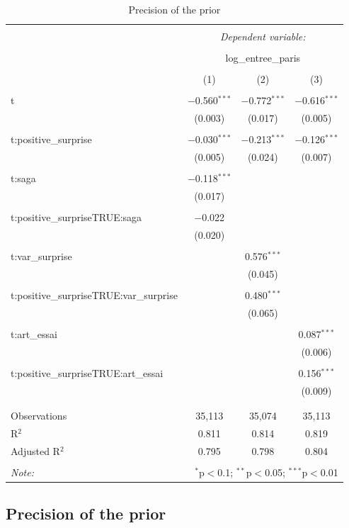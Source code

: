 \begin{table}[!htbp] \centering 
	\caption{Precision of the prior} 
	\label{} 
	\begin{tabular}{@{\extracolsep{5pt}}lccc} 
		\\[-1.8ex]\hline 
		\hline \\[-1.8ex] 
		& \multicolumn{3}{c}{\textit{Dependent variable:}} \\ 
		\cline{2-4} 
		\\[-1.8ex] & \multicolumn{3}{c}{log\_entree\_paris} \\ 
		\\[-1.8ex] & (1) & (2) & (3)\\ 
		\hline \\[-1.8ex] 
		t & $-$0.560$^{***}$ & $-$0.772$^{***}$ & $-$0.616$^{***}$ \\ 
		& (0.003) & (0.017) & (0.005) \\ 
		& & & \\ 
		t:positive\_surprise & $-$0.030$^{***}$ & $-$0.213$^{***}$ & $-$0.126$^{***}$ \\ 
		& (0.005) & (0.024) & (0.007) \\ 
		& & & \\ 
		t:saga & $-$0.118$^{***}$ &  &  \\ 
		& (0.017) &  &  \\ 
		& & & \\ 
		t:positive\_surpriseTRUE:saga & $-$0.022 &  &  \\ 
		& (0.020) &  &  \\ 
		& & & \\ 
		t:var\_surprise &  & 0.576$^{***}$ &  \\ 
		&  & (0.045) &  \\ 
		& & & \\ 
		t:positive\_surpriseTRUE:var\_surprise &  & 0.480$^{***}$ &  \\ 
		&  & (0.065) &  \\ 
		& & & \\ 
		t:art\_essai &  &  & 0.087$^{***}$ \\ 
		&  &  & (0.006) \\ 
		& & & \\ 
		t:positive\_surpriseTRUE:art\_essai &  &  & 0.156$^{***}$ \\ 
		&  &  & (0.009) \\ 
		& & & \\ 
		\hline \\[-1.8ex] 
		Observations & 35,113 & 35,074 & 35,113 \\ 
		R$^{2}$ & 0.811 & 0.814 & 0.819 \\ 
		Adjusted R$^{2}$ & 0.795 & 0.798 & 0.804 \\ 
		\hline 
		\hline \\[-1.8ex] 
		\textit{Note:}  & \multicolumn{3}{r}{$^{*}$p$<$0.1; $^{**}$p$<$0.05; $^{***}$p$<$0.01} \\ 
	\end{tabular} 
\end{table} 

\subsection{Precision of the prior}
